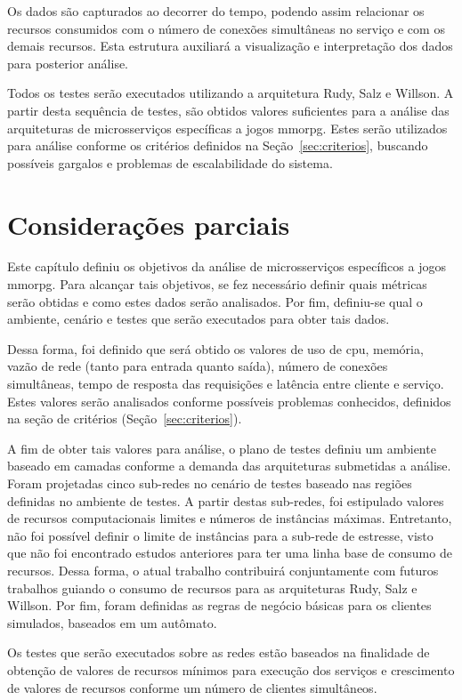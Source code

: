 Os dados são capturados ao decorrer do tempo, podendo assim relacionar os recursos consumidos com o número de conexões simultâneas no serviço e com os demais recursos.
%
Esta estrutura auxiliará a visualização e interpretação dos dados para posterior análise.

Todos os testes serão executados utilizando a arquitetura Rudy, Salz e Willson.
%
A partir desta sequência de testes, são obtidos valores suficientes para a análise das arquiteturas de microsserviços específicas a jogos \ac{mmorpg}.
%
Estes serão utilizados para análise conforme os critérios definidos na Seção~\ref{sec:criterios}, buscando possíveis gargalos e problemas de escalabilidade do sistema.


\section{Considerações parciais}


Este capítulo definiu os objetivos da análise de microsserviços específicos a jogos \ac{mmorpg}.
%
Para alcançar tais objetivos, se fez necessário definir quais métricas serão obtidas e como estes dados serão analisados.
%
Por fim, definiu-se qual o ambiente, cenário e testes que serão executados para obter tais dados.

Dessa forma, foi definido que será obtido os valores de uso de \ac{cpu}, memória, vazão de rede (tanto para entrada quanto saída), número de conexões simultâneas, tempo de resposta das requisições e latência entre cliente e serviço.
%
Estes valores serão analisados conforme possíveis problemas conhecidos, definidos na seção de critérios (Seção~\ref{sec:criterios}).

A fim de obter tais valores para análise, o plano de testes definiu um ambiente baseado em camadas conforme a demanda das arquiteturas submetidas a análise.
%
Foram projetadas cinco sub-redes no cenário de testes baseado nas regiões definidas no ambiente de testes.
%
A partir destas sub-redes, foi estipulado valores de recursos computacionais limites e números de instâncias máximas.
%
Entretanto, não foi possível definir o limite de instâncias para a sub-rede de estresse, visto que não foi encontrado estudos anteriores para ter uma linha base de consumo de recursos.
%
Dessa forma, o atual trabalho contribuirá conjuntamente com futuros trabalhos guiando o consumo de recursos para as arquiteturas Rudy, Salz e Willson.
%
Por fim, foram definidas as regras de negócio básicas para os clientes simulados, baseados em um autômato.

Os testes que serão executados sobre as redes estão baseados na finalidade de obtenção de valores de recursos mínimos para execução dos serviços e crescimento de valores de recursos conforme um número de clientes simultâneos.

